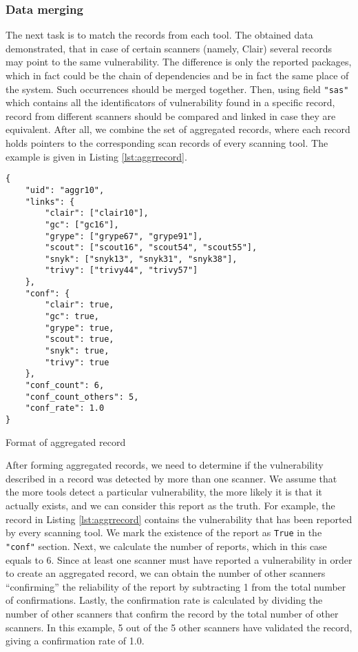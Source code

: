 \subsubsection*{Data merging}

The next task is to match the records from each tool. The obtained data demonstrated, that in case of certain scanners (namely, Clair) several records may point to the same vulnerability. The difference is only the reported packages, which in fact could be the chain of dependencies and be in fact the same place of the system. Such occurrences should be merged together. Then, using field \texttt{"sas"} which contains all the identificators of vulnerability found in a specific record, record from different scanners should be compared and linked in case they are equivalent. After all, we combine the set of aggregated records, where each record holds pointers to the corresponding scan records of every scanning tool. The example is given in Listing \ref{lst:aggrrecord}.


\begin{listing}[htp]
    \centering
    \begin{minipage}{0.7\linewidth}
        \begin{verbatim}
{
    "uid": "aggr10",
    "links": {
        "clair": ["clair10"],
        "gc": ["gc16"],
        "grype": ["grype67", "grype91"],
        "scout": ["scout16", "scout54", "scout55"],
        "snyk": ["snyk13", "snyk31", "snyk38"],
        "trivy": ["trivy44", "trivy57"]
    },
    "conf": {
        "clair": true,
        "gc": true,
        "grype": true,
        "scout": true,
        "snyk": true,
        "trivy": true
    },
    "conf_count": 6,
    "conf_count_others": 5,
    "conf_rate": 1.0
}
        \end{verbatim}
    \end{minipage}
    \caption{Format of aggregated record}
    \label{lst:aggrrecord}
\end{listing}

After forming aggregated records, we need to determine if the vulnerability described in a record was detected by more than one scanner. We assume that the more tools detect a particular vulnerability, the more likely it is that it actually exists, and we can consider this report as the truth. For example, the record in Listing \ref{lst:aggrrecord} contains the vulnerability that has been reported by every scanning tool. We mark the existence of the report as \texttt{True} in the \texttt{"conf"} section. Next, we calculate the number of reports, which in this case equals to 6. Since at least one scanner must have reported a vulnerability in order to create an aggregated record, we can obtain the number of other scanners ``confirming'' the reliability of the report by subtracting 1 from the total number of confirmations. Lastly, the confirmation rate is calculated by dividing the number of other scanners that confirm the record by the total number of other scanners. In this example, 5 out of the 5 other scanners have validated the record, giving a confirmation rate of 1.0.


